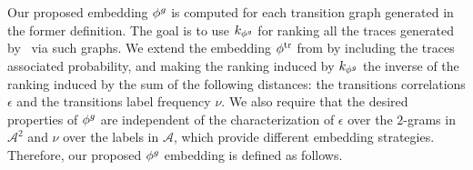 {Our proposed embedding $\phi^{g}$ is computed for each transition graph generated in the former definition. The goal is to use
$k_{\phi^{g}}$ for ranking all the traces generated by \unravelling\ via such graphs. We extend the embedding $\phi^{\text{tr}}$ from \cite{LodhiSSCW02} by including the traces associated probability, and making the ranking induced by $k_{\phi^{g}}$ the inverse of the ranking induced by the
sum of the following distances: the transitions correlations $\epsilon$ and the transitions label frequency $\nu$.}
{We also require that the desired properties of $\phi^{g}$ are independent of the characterization of $\epsilon$ over the $2$-grams in $\mathcal{A}^2$ and $\nu$ over the labels in $\mathcal{A}$, which  provide different embedding strategies. } Therefore, our proposed $\phi^{g}$ embedding is defined as follows.


